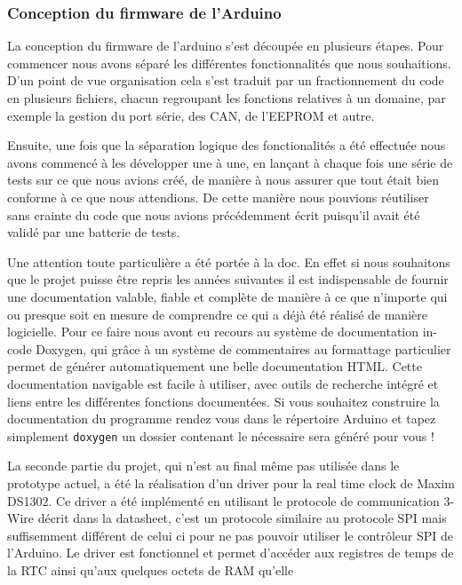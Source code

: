 		\subsubsection{Conception du firmware de l'Arduino}
		La conception du firmware de l'arduino s'est découpée en plusieurs étapes.
		Pour commencer nous avons séparé les différentes fonctionnalités que nous
		souhaitions. D'un point de vue organisation cela s'est traduit par un fractionnement
		du code en plusieurs fichiers, chacun regroupant les fonctions relatives à un
		domaine, par exemple la gestion du port série, des CAN, de l'EEPROM et autre.
		\par
		Ensuite, une fois que la séparation logique des fonctionalités a été effectuée
		nous avons commencé à les développer une à une, en lançant à chaque fois une
		série de tests sur ce que nous avions créé, de manière à nous assurer que tout
		était bien conforme à ce que nous attendions. De cette manière nous pouvions
		réutiliser sans crainte du code que nous avions précédemment écrit puisqu'il
		avait été validé par une batterie de tests.
		\par
		Une attention toute particulière a été portée à la doc. En effet si nous
		souhaitons que le projet puisse être repris les années suivantes il
		est indispensable de fournir une documentation valable, fiable et complète
		de manière à ce que n'importe qui ou presque soit en mesure de comprendre
		ce qui a déjà été réalisé de manière logicielle. Pour ce faire nous avont eu
		recours au système de documentation in-code Doxygen, qui grâce à un
		système de commentaires au formattage particulier permet de générer automatiquement
		une belle documentation HTML. Cette documentation navigable est facile à utiliser, avec outils
		de recherche intégré et liens entre les différentes fonctions documentées.
		Si vous souhaitez construire la documentation du programme rendez vous dans
		le répertoire Arduino et tapez simplement \texttt{doxygen} un dossier contenant
		le nécessaire sera généré pour vous !
		\par
		La seconde partie du projet, qui n'est au final même pas utilisée dans le prototype
		actuel, a été la réalisation d'un driver pour la real time clock de Maxim DS1302.
		Ce driver a été implémenté en utilisant le protocole de communication 3-Wire décrit dans
		la datasheet, c'est un protocole similaire au protocole SPI mais suffisemment différent de celui ci
		pour ne pas pouvoir utiliser le contrôleur SPI de l'Arduino. Le driver est fonctionnel et
		permet d'accéder aux registres de temps de la RTC ainsi qu'aux quelques octets de RAM qu'elle
